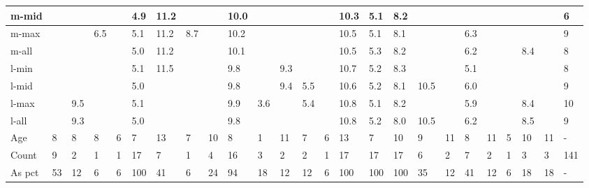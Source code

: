 \documentclass[10pt,letterpaper]{article}
\begin{document}
{\begin{tabular}{|l|l|l|l|l|l|l|l|l|l|l|l|l|l|l|l|l|l|l|l|l|l|l|l|l|}
        m-mid         & ~   &    &    & ~  &4.9 &11.2&     & ~   &10.0 & ~   &~    & ~   &     &10.3 & 5.1 & 8.2 & ~   &     &  ~  & ~   & ~  & ~   & ~   &  6 \\ \hline
        m-max         &     &    &6.5 & ~  &5.1 &11.2&8.7  &     &10.2 & ~   &~    &     &     &10.5 & 5.1 & 8.1 & ~   & ~   & 6.3 & ~   & ~  & ~   & ~   &  9  \\ \hline
        m-all         &     &    &    & ~  &5.0 &11.2&     &     &10.1 & ~   &~    &     &     &10.5 & 5.3 & 8.2 & ~   & ~   & 6.2 & ~   & ~  & 8.4 & ~   &  8  \\ \hline
        l-min         &     &    &    & ~  &5.1 &11.5&     &     & 9.8 & ~   &9.3  &     &     &10.7 & 5.2 & 8.3 & ~   & ~   & 5.1 & ~   & ~  & ~   & ~   &  8  \\ \hline
        l-mid         & ~   &    &    & ~  &5.0 & ~  &     & ~   & 9.8 & ~   &9.4  & 5.5 &     &10.6 & 5.2 & 8.1 &10.5 &     & 6.0 & ~   & ~  & ~   & ~   &  9  \\ \hline
        l-max         &     &9.5 &    & ~  &5.1 & ~  &     &     & 9.9 & 3.6 &~    & 5.4 &     &10.8 & 5.1 & 8.2 & ~   & ~   & 5.9 & ~   & ~  & 8.4 & ~   &  10  \\ \hline
        l-all         & ~   &9.3 &    & ~  &5.0 & ~  &     & ~   & 9.8 & ~   &     & ~   &     &10.8 & 5.2 & 8.0 &10.5 &     & 6.2 & ~   & ~  & 8.5 & ~   &  9  \\ \hline
        Age           & 8   &  8 & 8  & 6  & 7  & 13 & 7   & 10  & 8   & 1   &11   & 7   & 6   & 13  & 7   & 10  & 9   & 11  & 8  & 11   & 5   & 10 & 11  &  -  \\ \hline
        Count         & 9   &  2 & 1  & 1  &17  & 7  & 1   & 4   & 16  & 3   &2    & 2   & 1   &17   & 17  & 17  & 6   & 2   & 7  &  2   & 1   & 3  & 3   & 141 \\ \hline
        As pct        & 53  & 12 & 6  & 6  &100 & 41 & 6   & 24  & 94  & 18  &12   & 12  & 6   &100  & 100 & 100 & 35  & 12  & 41 &  12  & 6   & 18 & 18  & -  \\ \hline
    \end{tabular}
\label{table10}
}
\endgroup
\end{document}
